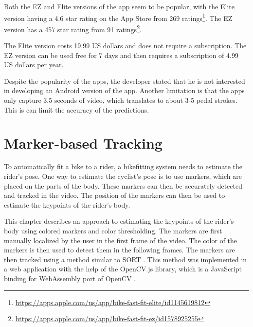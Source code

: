 


Both the EZ and Elite versions of the app seem to be popular, with the Elite version having a 4.6 star rating on the App Store from 269 ratings\footnote{\url{https://apps.apple.com/us/app/bike-fast-fit-elite/id1145619812}}. The EZ version has a 457 star rating from 91 ratings\footnote{\url{https://apps.apple.com/us/app/bike-fast-fit-ez/id1578925255}}.

The Elite version costs 19.99 US dollars and does not require a subscription. The EZ version can be used free for 7 days and then requires a subscription of 4.99 US dollars per year.

Despite the popularity of the apps, the developer stated that he is not interested in developing an Android version of the app. Another limitation is that the apps only capture 3.5 seconds of video, which translates to about 3-5 pedal strokes. This is can limit the accuracy of the predictions.


\chapter{Marker-based Tracking}
\label{marker_based_tracking}
To automatically fit a bike to a rider, a bikefitting system needs to estimate the rider's pose. One way to estimate the cyclist's pose is to use markers, which are placed on the parts of the body. These markers can then be accurately detected and tracked in the video. The position of the markers can then be used to estimate the keypoints of the rider's body.

This chapter describes an approach to estimating the keypoints of the rider's body using colored markers and color thresholding. The markers are first manually localized by the user in the first frame of the video. The color of the markers is then used to detect them in the following frames. The markers are then tracked using a method similar to SORT \cite{sort}. This method was implemented in a web application with the help of the OpenCV.js \cite{opencvjs} library, which is a JavaScript binding for WebAssembly port of OpenCV \cite{opencv}.


